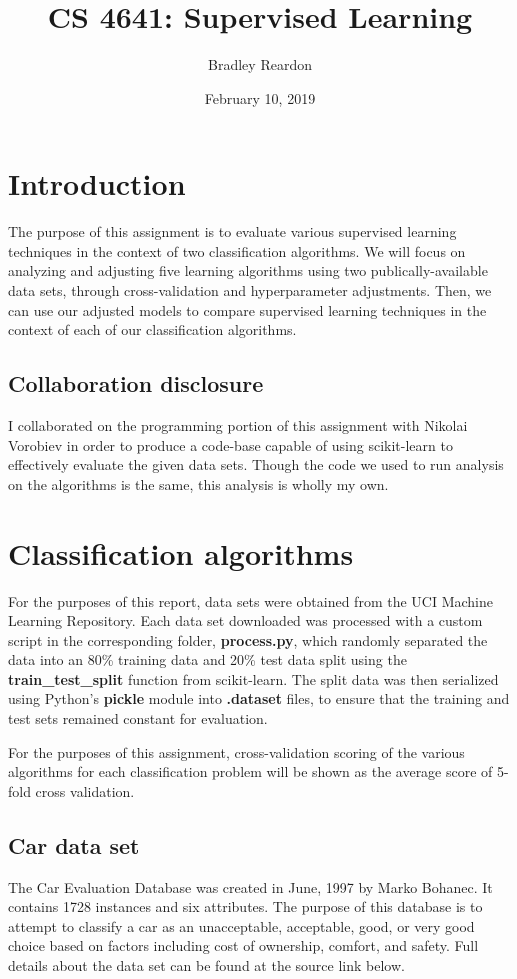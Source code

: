 \documentclass{article}
\title{\textbf{CS 4641:} Supervised Learning}
\author{Bradley Reardon}
\date{February 10, 2019}
\begin{document}
    \maketitle

    \section{Introduction}
    The purpose of this assignment is to evaluate various supervised learning techniques in the context of two classification algorithms. We will focus on analyzing and adjusting five learning algorithms using two publically-available data sets, through cross-validation and hyperparameter adjustments. Then, we can use our adjusted models to compare supervised learning techniques in the context of each of our classification algorithms.

    \subsection{Collaboration disclosure}
    I collaborated on the programming portion of this assignment with Nikolai Vorobiev in order to produce a code-base capable of using scikit-learn to effectively evaluate the given data sets. Though the code we used to run analysis on the algorithms is the same, this analysis is wholly my own.

    \section{Classification algorithms}
    For the purposes of this report, data sets were obtained from the UCI Machine Learning Repository. Each data set downloaded was processed with a custom script in the corresponding folder, \textbf{process.py}, which randomly separated the data into an 80\% training data and 20\% test data split using the \textbf{train\_test\_split} function from scikit-learn. The split data was then serialized using Python's \textbf{pickle} module into \textbf{.dataset} files, to ensure that the training and test sets remained constant for evaluation.

    For the purposes of this assignment, cross-validation scoring of the various algorithms for each classification problem will be shown as the average score of 5-fold cross validation.

    \subsection{Car data set}
    The Car Evaluation Database was created in June, 1997 by Marko Bohanec. It contains 1728 instances and six attributes. The purpose of this database is to attempt to classify a car as an unacceptable, acceptable, good, or very good choice based on factors including cost of ownership, comfort, and safety. Full details about the data set can be found at the source link below.
\end{document}
